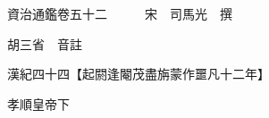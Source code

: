 










 


 
 


 

  
  
  
  
  





  
  
  
  
  
 
  

  

  
  
  



  

 
 

  
   




  

  
  


  　　資治通鑑卷五十二　　　宋　司馬光　撰

　　胡三省　音註

　　漢紀四十四【起閼逢閹茂盡旃蒙作噩凡十二年】

　　孝順皇帝下


